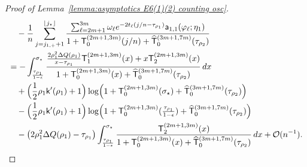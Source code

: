 \documentclass[a4paper]{article}
\numberwithin{equation}{section}
\begin{document}
\begin{proof}[Proof of Lemma~\ref{lemma:asymptotics E6(1)(2) counting osc}]
\begin{align*}
&\quad 
-\frac{1}{n}
\sum_{j=j_{1,+}+1}^{\lfloor j_{\star}\rfloor}
\frac{
\sum_{\ell={2m+1}}^{3m}\omega_{\ell}
e^{-2t_{\ell}(j/n-\tau_{\rho_1})}
\mathsf{a}_{1,1}(\varphi_{\ell};\eta_1)
}{
1+\mathsf{T}_{0}^{(2m+1,3m)}(j/n)+\widehat{\mathsf{T}}_0^{(3m+1,7m)}(\tau_{\rho_2})}
\\
&=
-
\int_{\frac{\tau_{\rho_1}}{1-\epsilon}}^{\sigma_{\star}}
\frac{\frac{2\rho_1^2\Delta Q(\rho_1)}{x-\tau_{\rho_1}}
\mathsf{T}_{1}^{(2m+1,3m)}(x)
+
x\mathsf{T}_{2}^{(2m+1,3m)}(x)
}{
1+\mathsf{T}_{0}^{(2m+1,3m)}(x)+\widehat{\mathsf{T}}_0^{(3m+1,7m)}(\tau_{\rho_2})}\,dx
\\
&\quad 
+
\Bigl(\frac{1}{2}\rho_1\mathsf{k}'(\rho_1)+1\Bigr)
\log\Bigl(1+\mathsf{T}_{0}^{(2m+1,3m)}(\sigma_{\star})+\widehat{\mathsf{T}}_0^{(3m+1,7m)}(\tau_{\rho_2})\Bigr)
\\
&\quad
-
\Bigl(\frac{1}{2}\rho_1\mathsf{k}'(\rho_1)+1\Bigr)
\log\Bigl(1+\mathsf{T}_{0}^{(2m+1,3m)}(\tfrac{\tau_{\rho_1}}{1-\epsilon})+\widehat{\mathsf{T}}_0^{(3m+1,7m)}(\tau_{\rho_2})\Bigr)
\\
&\quad 
-
\bigl(2\rho_1^2\Delta Q(\rho_1)-\tau_{\rho_1}\bigr)
\int_{\frac{\tau_{\rho_1}}{1-\epsilon}}^{\sigma_{\star}}
\frac{
\mathsf{T}_{2}^{(2m+1,3m)}(x)
}{
1+\mathsf{T}_{0}^{(2m+1,3m)}(x)+\widehat{\mathsf{T}}_0^{(3m+1,7m)}(\tau_{\rho_2})}\,dx
+\mathcal{O}(n^{-1}).
\end{align*}

\end{proof}
\end{document}
